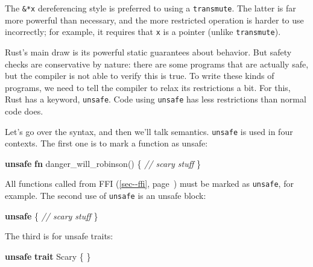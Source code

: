 \documentclass[a4paper,]{book}
\renewcommand*{\hyperref}[2][\ar]{%
  \def\ar{#2}%
  #2 (\autoref{#1}, page~\pageref{#1})}
\newenvironment{Shaded}{\begin{snugshade}}{\end{snugshade}}
\newcommand{\KeywordTok}[1]{\textcolor[rgb]{0.13,0.29,0.53}{\textbf{{#1}}}}
\newcommand{\CommentTok}[1]{\textcolor[rgb]{0.56,0.35,0.01}{\textit{{#1}}}}
\newcommand{\NormalTok}[1]{{#1}}
\begin{document}
The \texttt{\&*x} dereferencing style is preferred to using a
\texttt{transmute}. The latter is far more powerful than necessary, and
the more restricted operation is harder to use incorrectly; for example,
it requires that \texttt{x} is a pointer (unlike \texttt{transmute}).


Rust's main draw is its powerful static guarantees about behavior. But
safety checks are conservative by nature: there are some programs that
are actually safe, but the compiler is not able to verify this is true.
To write these kinds of programs, we need to tell the compiler to relax
its restrictions a bit. For this, Rust has a keyword, \texttt{unsafe}.
Code using \texttt{unsafe} has less restrictions than normal code does.

Let's go over the syntax, and then we'll talk semantics. \texttt{unsafe}
is used in four contexts. The first one is to mark a function as unsafe:

\begin{Shaded}
\begin{Highlighting}[]
\KeywordTok{unsafe} \KeywordTok{fn} \NormalTok{danger_will_robinson() \{}
    \CommentTok{// scary stuff}
\NormalTok{\}}
\end{Highlighting}
\end{Shaded}

All functions called from \hyperref[sec--ffi]{FFI} must be marked as
\texttt{unsafe}, for example. The second use of \texttt{unsafe} is an
unsafe block:

\begin{Shaded}
\begin{Highlighting}[]
\KeywordTok{unsafe} \NormalTok{\{}
    \CommentTok{// scary stuff}
\NormalTok{\}}
\end{Highlighting}
\end{Shaded}

The third is for unsafe traits:

\begin{Shaded}
\begin{Highlighting}[]
\KeywordTok{unsafe} \KeywordTok{trait} \NormalTok{Scary \{ \}}
\end{Highlighting}
\end{Shaded}
\end{document}
